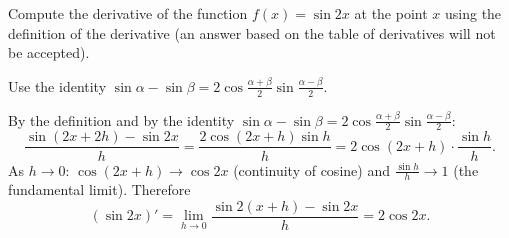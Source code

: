 
\begin{question}
Compute the derivative of the function $f(x)=\sin2x$ at the point $x$ using the definition of the derivative (an answer based on the table of derivatives will not be accepted).
\end{question}

\begin{hint}
Use the identity $\sin\alpha-\sin\beta=2\cos\frac{\alpha+\beta}{2}\sin\frac{\alpha-\beta}{2}$.
\end{hint}

\begin{solution}
By the definition and by the identity $\sin\alpha-\sin\beta=2\cos\frac{\alpha+\beta}{2}\sin\frac{\alpha-\beta}{2}$:
\[
\frac{\sin(2x+2h)-\sin2x}{h}=\frac{2\cos(2x+h)\sin h}{h}=2\cos(2x+h)\cdot\frac{\sin h}{h}.
\]
As $h\to0$: $\cos(2x+h)\to\cos2x$ (continuity of cosine) and $\frac{\sin h}{h}\to1$ (the fundamental limit). Therefore
\[
(\sin2x)'=\lim_{h\to0}\frac{\sin2(x+h)-\sin2x}{h}=2\cos2x.
\]
\end{solution}
